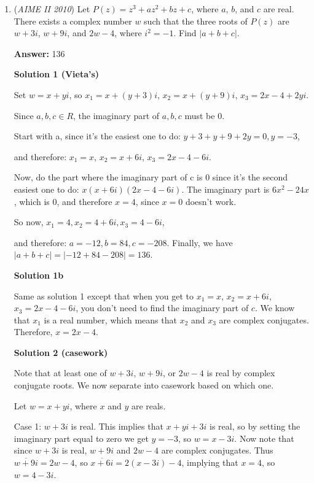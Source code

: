 \begin{enumerate}
 


	\item (\textit{AIME II 2010}) Let $P(z)=z^3+az^2+bz+c$, where $a$, $b$, and $c$ are real. There exists a complex number $w$ such that the three roots of $P(z)$ are $w+3i$, $w+9i$, and $2w-4$, where $i^2=-1$. Find $|a+b+c|$.


 
 \textbf{Answer: }136



\textbf{Solution 1 (Vieta's)}

Set $w=x+yi$, so $x_1 = x+(y+3)i$, $x_2 = x+(y+9)i$, $x_3 = 2x-4+2yi$.

 Since $a,b,c\in{R}$, the imaginary part of $a,b,c$ must be $0$.

 Start with a, since it's the easiest one to do: $y+3+y+9+2y=0, y=-3$,

 and therefore: $x_1 = x$, $x_2 = x+6i$, $x_3 = 2x-4-6i$.

 Now, do the part where the imaginary part of c is 0 since it's the second easiest one to do: $x(x+6i)(2x-4-6i)$. The imaginary part is $6x^2-24x$, which is 0, and therefore $x=4$, since $x=0$ doesn't work.

 So now, $x_1 = 4, x_2 = 4+6i, x_3 = 4-6i$,

 and therefore: $a=-12, b=84, c=-208$. Finally, we have $|a+b+c|=|-12+84-208|=\boxed{136}$.

 



\textbf{Solution 1b}

Same as solution 1 except that when you get to $x_1 = x$, $x_2 = x+6i$, $x_3 = 2x-4-6i$, you don't need to find the imaginary part of $c$. We know that $x_1$ is a real number, which means that $x_2$ and $x_3$ are complex conjugates. Therefore, $x=2x-4$.

 



\textbf{Solution 2 (casework)}

Note that at least one of $w+3i$, $w+9i$, or $2w-4$ is real by complex conjugate roots. We now separate into casework based on which one.

 Let $w=x+yi$, where $x$ and $y$ are reals.

 Case 1: $w+3i$ is real. This implies that $x+yi+3i$ is real, so by setting the imaginary part equal to zero we get $y=-3$, so $w=x-3i$. Now note that since $w+3i$ is real, $w+9i$ and $2w-4$ are complex conjugates. Thus $\overline{w+9i}=2w-4$, so $\overline{x+6i}=2(x-3i)-4$, implying that $x=4$, so $w=4-3i$.


\end{enumerate}
